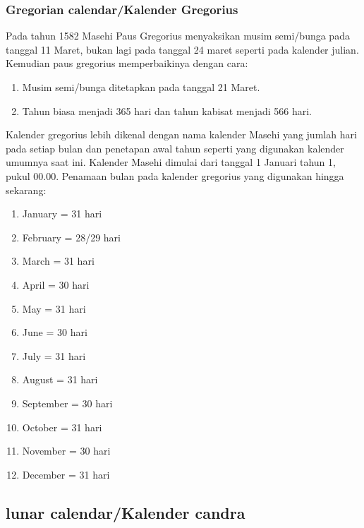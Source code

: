     \subsubsection{Gregorian calendar/Kalender Gregorius}
      Pada tahun 1582 Masehi Paus Gregorius menyaksikan musim semi/bunga pada tanggal 11 Maret, bukan lagi pada tanggal 24 maret seperti pada kalender julian. Kemudian paus gregorius memperbaikinya dengan cara:
\begin{enumerate}
      \item Musim semi/bunga ditetapkan pada tanggal 21 Maret.
      \item Tahun biasa menjadi 365 hari dan tahun kabisat menjadi 566 hari.
\end{enumerate}
      Kalender gregorius lebih dikenal dengan nama kalender Masehi yang jumlah hari pada setiap bulan dan penetapan awal tahun seperti yang digunakan kalender umumnya saat ini. Kalender Masehi dimulai dari tanggal 1 Januari
      tahun 1, pukul 00.00. Penamaan bulan pada kalender gregorius yang digunakan hingga sekarang:
      \begin{enumerate}
        \item  January   = 31 hari
        \item  February  = 28/29 hari
        \item  March     = 31 hari
        \item  April     = 30 hari
        \item  May       = 31 hari
        \item  June      = 30 hari
        \item  July      = 31 hari
        \item  August    = 31 hari
        \item  September = 30 hari
        \item  October  = 31 hari
        \item  November = 30 hari
        \item  December = 31 hari
      \end{enumerate}

 \subsection{lunar calendar/Kalender candra}

